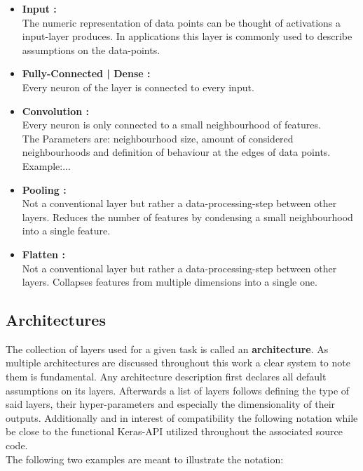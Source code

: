 \begin{itemize}
	\item \textbf{Input :}\\
	The numeric representation of data points can be thought of activations a input-layer produces. In applications this layer is commonly used to describe assumptions on the data-points.  \\
	\item \textbf{Fully-Connected | Dense :}\\
	Every neuron of the layer is connected to every input.\\
	\item \textbf{Convolution :}\\
	Every neuron is only connected to a small neighbourhood of features.\\
	The Parameters are: neighbourhood size, amount of considered neighbourhoods and definition of behaviour at the edges of data points.\\
	Example:...\\
	\item \textbf{Pooling :}\\
	Not a conventional layer but rather a data-processing-step between other layers. Reduces the number of features by condensing a small neighbourhood into a single feature.\\
	\item \textbf{Flatten :}\\  
	Not a conventional layer but rather a data-processing-step between other layers. Collapses features from multiple dimensions into a single one.\\
\end{itemize}

\subsection{Architectures}
The collection of layers used for a given task is called an \textbf{architecture}. As multiple architectures are discussed throughout this work a clear system to note them is fundamental. Any architecture description first declares all default assumptions on its layers. Afterwards a list of layers follows defining the type of said layers, their hyper-parameters and especially the dimensionality of their outputs. Additionally and in interest of compatibility the following notation while be close to the functional Keras-API utilized throughout the associated source code.\\
The following two examples are meant to illustrate the notation:


